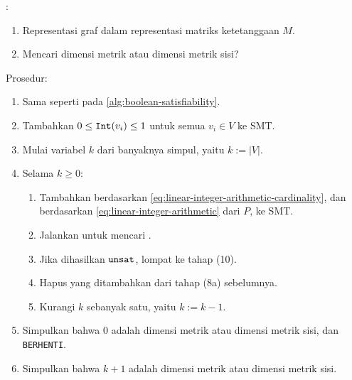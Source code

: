 \begin{algorithm}[H]
	:
	\begin{enumerate}
		\item Representasi graf dalam representasi matriks ketetanggaan \(M\).
		\item Mencari dimensi metrik atau dimensi metrik sisi?
	\end{enumerate}
	Prosedur:
	\begin{enumerate}
		\item[1--5.] Sama seperti pada \autoref{alg:boolean-satisfiability}.
		\setcounter{enumi}{5}
		\item Tambahkan  \(0 \leq \mathtt{Int}(v_i) \leq 1\) untuk semua \(v_i \in V\) ke  SMT.
		\item Mulai variabel \(k\) dari banyaknya simpul, yaitu \(k := |V|\).
		\item Selama \(k \geq 0\):
			\begin{enumerate}
					\item Tambahkan  berdasarkan \autoref{eq:linear-integer-arithmetic-cardinality}, dan berdasarkan \autoref{eq:linear-integer-arithmetic} dari \(P\), ke  SMT.
					\item Jalankan  untuk mencari .
					\item Jika dihasilkan \(\mathtt{unsat}\), lompat ke tahap (10).
					\item Hapus  yang ditambahkan dari tahap (8a) sebelumnya.
					\item Kurangi \(k\) sebanyak satu, yaitu \(k := k - 1\).
			\end{enumerate}
		\item Simpulkan bahwa 0 adalah dimensi metrik atau dimensi metrik sisi, dan \texttt{BERHENTI}.
		\item Simpulkan bahwa \(k + 1\) adalah dimensi metrik atau dimensi metrik sisi.
	\end{enumerate}
	\caption{}
	\label{alg:linear-integer-arithmetic}
\end{algorithm}

\vspace{-0.5em}

\subsection{}

